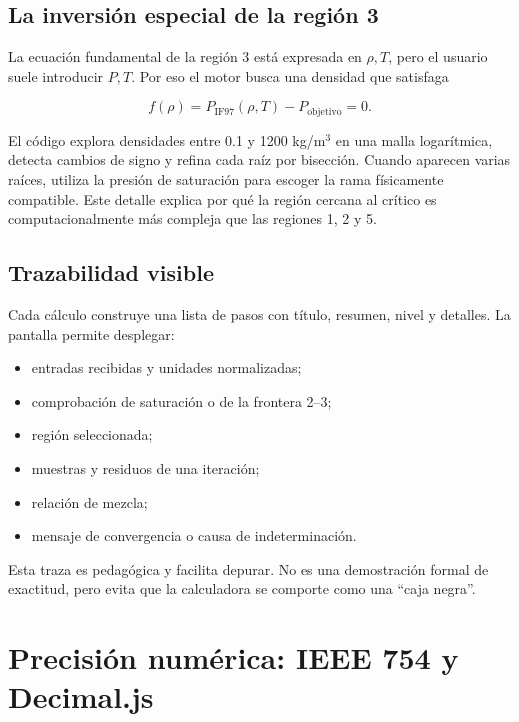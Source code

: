 \documentclass[11pt,a4paper,oneside]{article}
\begin{document}
\subsection{La inversi\'on especial de la regi\'on 3}

La ecuaci\'on fundamental de la regi\'on 3 est\'a expresada en $\rho,T$, pero el usuario suele introducir $P,T$. Por eso el motor busca una densidad que satisfaga

\begin{equation}
  f(\rho)=P_{\mathrm{IF97}}(\rho,T)-P_{\mathrm{objetivo}}=0.
\end{equation}

El c\'odigo explora densidades entre 0.1 y 1200 kg/m$^3$ en una malla logar\'itmica, detecta cambios de signo y refina cada ra\'iz por bisecci\'on. Cuando aparecen varias ra\'ices, utiliza la presi\'on de saturaci\'on para escoger la rama f\'isicamente compatible. Este detalle explica por qu\'e la regi\'on cercana al cr\'itico es computacionalmente m\'as compleja que las regiones 1, 2 y 5.

\subsection{Trazabilidad visible}

Cada c\'alculo construye una lista de pasos con t\'itulo, resumen, nivel y detalles. La pantalla permite desplegar:

\begin{itemize}
  \item entradas recibidas y unidades normalizadas;
  \item comprobaci\'on de saturaci\'on o de la frontera 2--3;
  \item regi\'on seleccionada;
  \item muestras y residuos de una iteraci\'on;
  \item relaci\'on de mezcla;
  \item mensaje de convergencia o causa de indeterminaci\'on.
\end{itemize}

Esta traza es pedag\'ogica y facilita depurar. No es una demostraci\'on formal de exactitud, pero evita que la calculadora se comporte como una ``caja negra''.

\section{Precisi\'on num\'erica: IEEE 754 y Decimal.js}
\end{document}
